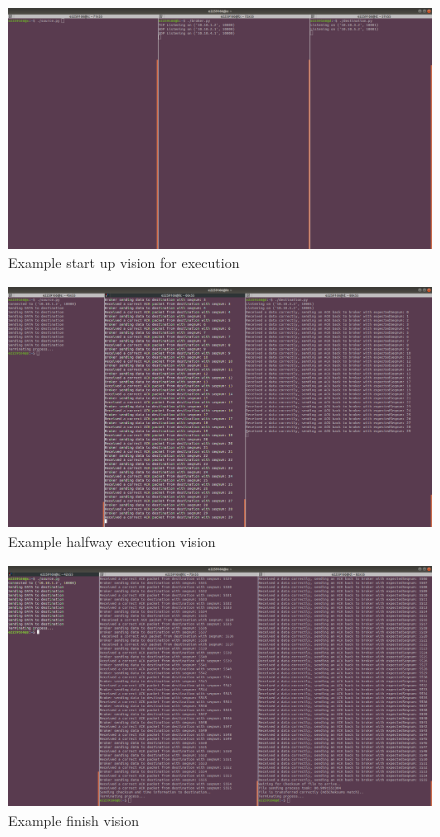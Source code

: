 \documentclass[conference]{IEEEtran}
\begin{document}
\begin{figure}[H]
    \centering
    \includegraphics[scale=0.13]{start_up.png}
    \caption{Example start up vision for execution}
\end{figure}

\begin{figure}[H]
    \centering
    \includegraphics[scale=0.13]{halfway_execution.png}
    \caption{Example halfway execution vision}
\end{figure}

\begin{figure}[H]
    \centering
    \includegraphics[scale=0.13]{finish.png}
    \caption{Example finish vision}
\end{figure}
\end{document}
